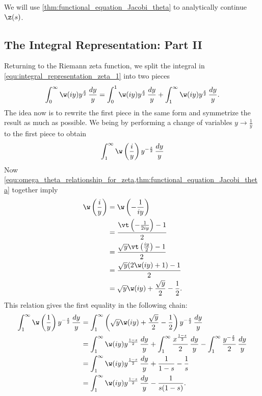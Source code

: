       We will use \cref{thm:functional_equation_Jacobi_theta} to analytically continue $\z(s)$.
    \subsection*{The Integral Representation: Part II}
      Returning to the Riemann zeta function, we split the integral in \cref{equ:integral_representation_zeta_1} into two pieces
      \begin{equation}\label{equ:symmetric_integral_zeta_split}
        \int_{0}^{\infty}\w(iy)y^{\frac{s}{2}}\,\frac{dy}{y} = \int_{0}^{1}\w(iy)y^{\frac{s}{2}}\,\frac{dy}{y}+\int_{1}^{\infty}\w(iy)y^{\frac{s}{2}}\,\frac{dy}{y}.
      \end{equation}
      The idea now is to rewrite the first piece in the same form and symmetrize the result as much as possible. We being by performing a change of variables $y \to \frac{1}{y}$ to the first piece to obtain
      \[
        \int_{1}^{\infty}\w\left(\frac{i}{y}\right)y^{-\frac{s}{2}}\,\frac{dy}{y}
      \]
      Now \cref{equ:omega_theta_relationship_for_zeta,thm:functional_equation_Jacobi_theta} together imply
      \begin{align*}
        \w\left(\frac{i}{y}\right) &= \w\left(-\frac{1}{iy}\right) \\
        &= \frac{\vt\left(-\frac{1}{2iy}\right)-1}{2} \\
        &= \frac{\sqrt{y}\vt\left(\frac{iy}{2}\right)-1}{2} \\
        &= \frac{\sqrt{y}(2\w(iy)+1)-1}{2} \\
        &= \sqrt{y}\w(iy)+\frac{\sqrt{y}}{2}-\frac{1}{2}.
      \end{align*}
      This relation gives the first equality in the following chain:
      \begin{align*}
        \int_{1}^{\infty}\w\left(\frac{1}{y}\right)y^{-\frac{s}{2}}\,\frac{dy}{y} &= \int_{1}^{\infty}\left(\sqrt{y}\w(iy)+\frac{\sqrt{y}}{2}-\frac{1}{2}\right)y^{-\frac{s}{2}}\,\frac{dy}{y} \\
        &= \int_{1}^{\infty}\w(iy)y^{\frac{1-s}{2}}\,\frac{dy}{y}+\int_{1}^{\infty}\frac{x^{\frac{1-s}{2}}}{2}\,\frac{dy}{y}-\int_{1}^{\infty}\frac{y^{-\frac{s}{2}}}{2}\,\frac{dy}{y} \\
        &= \int_{1}^{\infty}\w(iy)y^{\frac{1-s}{2}}\,\frac{dy}{y}+\frac{1}{1-s}-\frac{1}{s} \\
        &= \int_{1}^{\infty}\w(iy)y^{\frac{1-s}{2}}\,\frac{dy}{y}-\frac{1}{s(1-s)}.
      \end{align*}

